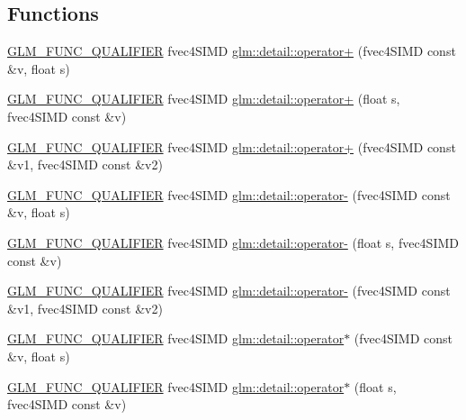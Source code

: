 \subsection*{Functions}
\begin{DoxyCompactItemize}
\item 
\hyperlink{setup_8hpp_a33fdea6f91c5f834105f7415e2a64407}{G\+L\+M\+\_\+\+F\+U\+N\+C\+\_\+\+Q\+U\+A\+L\+I\+F\+I\+ER} fvec4\+S\+I\+MD \hyperlink{namespaceglm_1_1detail_a45efa4aad92d96409a70747c0dc60002}{glm\+::detail\+::operator+} (fvec4\+S\+I\+MD const \&v, float s)
\item 
\hyperlink{setup_8hpp_a33fdea6f91c5f834105f7415e2a64407}{G\+L\+M\+\_\+\+F\+U\+N\+C\+\_\+\+Q\+U\+A\+L\+I\+F\+I\+ER} fvec4\+S\+I\+MD \hyperlink{namespaceglm_1_1detail_adf78a90e11a6b2bdf419cc04fae5407c}{glm\+::detail\+::operator+} (float s, fvec4\+S\+I\+MD const \&v)
\item 
\hyperlink{setup_8hpp_a33fdea6f91c5f834105f7415e2a64407}{G\+L\+M\+\_\+\+F\+U\+N\+C\+\_\+\+Q\+U\+A\+L\+I\+F\+I\+ER} fvec4\+S\+I\+MD \hyperlink{namespaceglm_1_1detail_a015946565bf753ced27292739ae9212d}{glm\+::detail\+::operator+} (fvec4\+S\+I\+MD const \&v1, fvec4\+S\+I\+MD const \&v2)
\item 
\hyperlink{setup_8hpp_a33fdea6f91c5f834105f7415e2a64407}{G\+L\+M\+\_\+\+F\+U\+N\+C\+\_\+\+Q\+U\+A\+L\+I\+F\+I\+ER} fvec4\+S\+I\+MD \hyperlink{namespaceglm_1_1detail_a2ccde71dbbac0adcfa13ee322d5313eb}{glm\+::detail\+::operator-\/} (fvec4\+S\+I\+MD const \&v, float s)
\item 
\hyperlink{setup_8hpp_a33fdea6f91c5f834105f7415e2a64407}{G\+L\+M\+\_\+\+F\+U\+N\+C\+\_\+\+Q\+U\+A\+L\+I\+F\+I\+ER} fvec4\+S\+I\+MD \hyperlink{namespaceglm_1_1detail_aeb2f0978202f5110b6303a3151797240}{glm\+::detail\+::operator-\/} (float s, fvec4\+S\+I\+MD const \&v)
\item 
\hyperlink{setup_8hpp_a33fdea6f91c5f834105f7415e2a64407}{G\+L\+M\+\_\+\+F\+U\+N\+C\+\_\+\+Q\+U\+A\+L\+I\+F\+I\+ER} fvec4\+S\+I\+MD \hyperlink{namespaceglm_1_1detail_a2e5e6062fe6a3f295b0f17a9bf4463e0}{glm\+::detail\+::operator-\/} (fvec4\+S\+I\+MD const \&v1, fvec4\+S\+I\+MD const \&v2)
\item 
\hyperlink{setup_8hpp_a33fdea6f91c5f834105f7415e2a64407}{G\+L\+M\+\_\+\+F\+U\+N\+C\+\_\+\+Q\+U\+A\+L\+I\+F\+I\+ER} fvec4\+S\+I\+MD \hyperlink{namespaceglm_1_1detail_a640fd1bfb152eec121c97429854496cf}{glm\+::detail\+::operator$\ast$} (fvec4\+S\+I\+MD const \&v, float s)
\item 
\hyperlink{setup_8hpp_a33fdea6f91c5f834105f7415e2a64407}{G\+L\+M\+\_\+\+F\+U\+N\+C\+\_\+\+Q\+U\+A\+L\+I\+F\+I\+ER} fvec4\+S\+I\+MD \hyperlink{namespaceglm_1_1detail_a00cbd7d01eca0724ee68cdf04fa55d62}{glm\+::detail\+::operator$\ast$} (float s, fvec4\+S\+I\+MD const \&v)

\end{DoxyCompactItemize}
